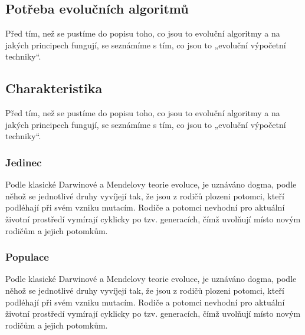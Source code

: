 \documentclass[bc,male,java,dept460]{diploma}		%
\begin{document}
\subsection{Potřeba evolučních algoritmů}
Před tím, než se pustíme do popisu toho, co jsou to evoluční algoritmy a na jakých principech fungují, se seznámíme s tím, co jsou to „evoluční výpočetní techniky“.

\subsection{Charakteristika}
Před tím, než se pustíme do popisu toho, co jsou to evoluční algoritmy a na jakých principech fungují, se seznámíme s tím, co jsou to „evoluční výpočetní techniky“.

\subsubsection{Jedinec}
Podle klasické Darwinové a Mendelovy teorie evoluce, je uznáváno dogma, podle něhož se jednotlivé druhy vyvíjejí tak, že jsou z rodičů plozeni potomci, kteří podléhají při svém vzniku mutacím. Rodiče a potomci nevhodní pro aktuální životní prostředí vymírají cyklicky po tzv. generacích, čímž uvolňují místo novým rodičům a jejich potomkům.

\subsubsection{Populace}
Podle klasické Darwinové a Mendelovy teorie evoluce, je uznáváno dogma, podle něhož se jednotlivé druhy vyvíjejí tak, že jsou z rodičů plozeni potomci, kteří podléhají při svém vzniku mutacím. Rodiče a potomci nevhodní pro aktuální životní prostředí vymírají cyklicky po tzv. generacích, čímž uvolňují místo novým rodičům a jejich potomkům.
\end{document}
